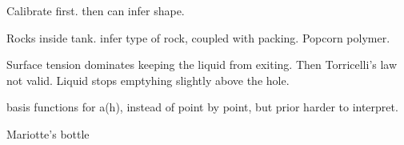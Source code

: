 \documentclass[openacc]{rsproca_new}%
\begin{document}
Calibrate first. then can infer shape.

Rocks inside tank. infer type of rock, coupled with packing. Popcorn polymer.

Surface tension dominates keeping the liquid from exiting. Then Torricelli's law not valid. Liquid stops emptyhing slightly above the hole. 

basis functions for a(h), instead of point by point, but prior harder to interpret.

Mariotte's bottle \cite{kirevs2006mariotte}

\enlargethispage{20pt}




\vskip2pc



\end{document}
